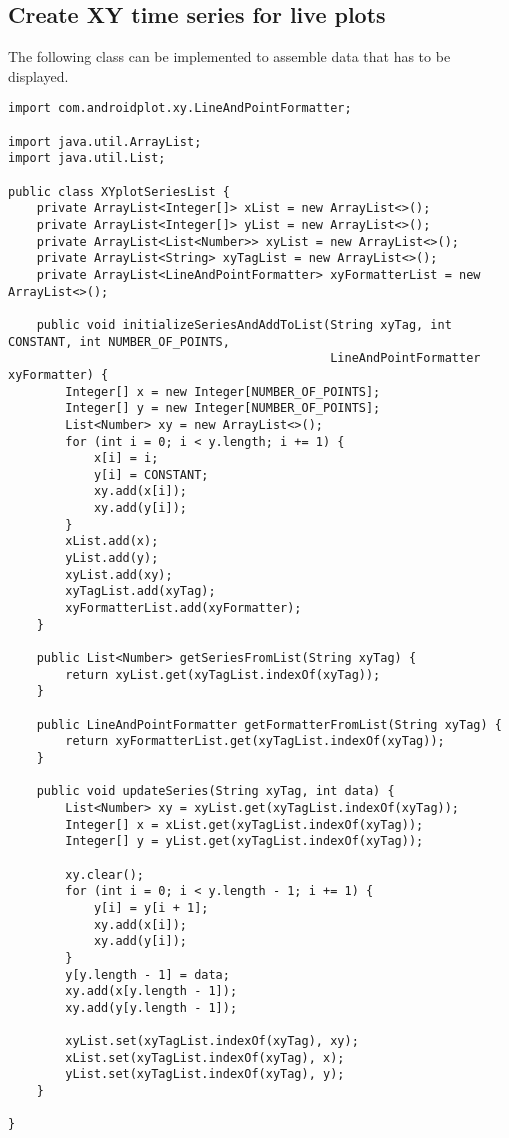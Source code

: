 \documentclass[11pt]{article}
\begin{document}
\subsection{Create XY time series for live plots}
\label{TimeSeries}
The following class can be implemented to assemble data that has to be displayed. 
\begin{lstlisting}
import com.androidplot.xy.LineAndPointFormatter;

import java.util.ArrayList;
import java.util.List;

public class XYplotSeriesList {
    private ArrayList<Integer[]> xList = new ArrayList<>();
    private ArrayList<Integer[]> yList = new ArrayList<>();
    private ArrayList<List<Number>> xyList = new ArrayList<>();
    private ArrayList<String> xyTagList = new ArrayList<>();
    private ArrayList<LineAndPointFormatter> xyFormatterList = new ArrayList<>();

    public void initializeSeriesAndAddToList(String xyTag, int CONSTANT, int NUMBER_OF_POINTS,
                                             LineAndPointFormatter xyFormatter) {
        Integer[] x = new Integer[NUMBER_OF_POINTS];
        Integer[] y = new Integer[NUMBER_OF_POINTS];
        List<Number> xy = new ArrayList<>();
        for (int i = 0; i < y.length; i += 1) {
            x[i] = i;
            y[i] = CONSTANT;
            xy.add(x[i]);
            xy.add(y[i]);
        }
        xList.add(x);
        yList.add(y);
        xyList.add(xy);
        xyTagList.add(xyTag);
        xyFormatterList.add(xyFormatter);
    }

    public List<Number> getSeriesFromList(String xyTag) {
        return xyList.get(xyTagList.indexOf(xyTag));
    }

    public LineAndPointFormatter getFormatterFromList(String xyTag) {
        return xyFormatterList.get(xyTagList.indexOf(xyTag));
    }

    public void updateSeries(String xyTag, int data) {
        List<Number> xy = xyList.get(xyTagList.indexOf(xyTag));
        Integer[] x = xList.get(xyTagList.indexOf(xyTag));
        Integer[] y = yList.get(xyTagList.indexOf(xyTag));

        xy.clear();
        for (int i = 0; i < y.length - 1; i += 1) {
            y[i] = y[i + 1];
            xy.add(x[i]);
            xy.add(y[i]);
        }
        y[y.length - 1] = data;
        xy.add(x[y.length - 1]);
        xy.add(y[y.length - 1]);

        xyList.set(xyTagList.indexOf(xyTag), xy);
        xList.set(xyTagList.indexOf(xyTag), x);
        yList.set(xyTagList.indexOf(xyTag), y);
    }

}
\end{lstlisting}
\end{document}
